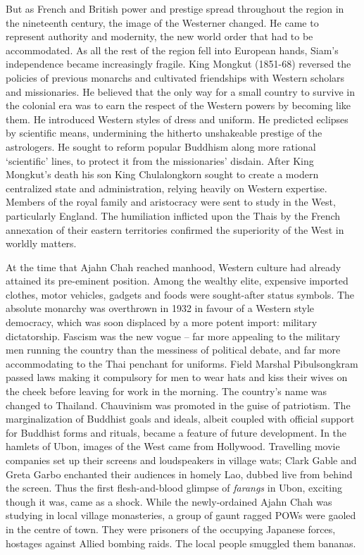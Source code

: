 But as French and British power and prestige spread throughout the
region in the nineteenth century, the image of the Westerner changed. He
came to represent authority and modernity, the new world order that had
to be accommodated. As all the rest of the region fell into European
hands, Siam's independence became increasingly fragile. King Mongkut
 (1851-68) reversed the policies of previous monarchs and cultivated
friendships with Western scholars and missionaries. He believed that the
only way for a small country to survive in the colonial era was to earn
the respect of the Western powers by becoming like them. He introduced
Western styles of dress and uniform. He predicted eclipses by scientific
means, undermining the hitherto unshakeable prestige of the astrologers. 
He sought to reform popular Buddhism along more rational `scientific'
lines, to protect it from the missionaries' disdain. After King
Mongkut's death his son King Chulalongkorn sought to create a modern
centralized state and administration, relying heavily on Western
expertise. Members of the royal family and aristocracy were sent to
study in the West, particularly England. The humiliation inflicted upon
the Thais by the French annexation of their eastern territories
confirmed the superiority of the West in worldly matters. 

At the time that Ajahn Chah reached manhood, Western culture had already
attained its pre-eminent position. Among the wealthy elite, expensive
imported clothes, motor vehicles, gadgets and foods were sought-after
status symbols. The absolute monarchy was overthrown in 1932 in favour
of a Western style democracy, which was soon displaced by a more potent
import: military dictatorship. Fascism was the new vogue -- far more
appealing to the military men running the country than the messiness of
political debate, and far more accommodating to the Thai penchant for
uniforms. Field Marshal Pibulsongkram passed laws making it compulsory
for men to wear hats and kiss their wives on the cheek before leaving
for work in the morning. The country's name was changed to Thailand. 
Chauvinism was promoted in the guise of patriotism. The marginalization
of Buddhist goals and ideals, albeit coupled with official support for
Buddhist forms and rituals, became a feature of future development. In
the hamlets of Ubon, images of the West came from Hollywood. Travelling
movie companies set up their screens and loudspeakers in village wats; 
Clark Gable and Greta Garbo enchanted their audiences in homely Lao, 
dubbed live from behind the screen. Thus the first flesh-and-blood
glimpse of \emph{farangs} in Ubon, exciting though it was, came as a
shock. While the newly-ordained Ajahn Chah was studying in local village
monasteries, a group of gaunt ragged POWs were gaoled in the centre of
town. They were prisoners of the occupying Japanese forces, hostages
against Allied bombing raids. The local people smuggled them bananas. 

